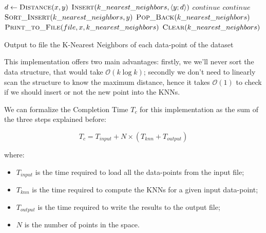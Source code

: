 \documentclass[12pt, letterpaper]{article}  %
\newcommand{\bigO}{\mathcal{O}}
\begin{document}
\begin{algorithm}
    \begin{algorithmic}
                    \State $d \gets \textsc{Distance}(x, y)$
                        \State $\textsc{Insert}(k\_nearest\_neighbors, \left < y ; d \right >)$
                        \State $continue$
                    \EndIf
                        \State $continue$ 
                    \EndIf
                    \State $\textsc{Sort\_Insert}(k\_nearest\_neighbors, y)$
                            \State $\textsc{Pop\_Back}(k\_nearest\_neighbors)$
                    \EndIf
                \EndFor
                \State $\textsc{Print\_to\_File}(file, x, k\_nearest\_neighbors)$
                \State $\textsc{Clear}(k\_nearest\_neighbors)$
            \EndFor
        \EndFunction
    \end{algorithmic}
    \caption{Output to file the K-Nearest Neighbors of each data-point of the dataset}
    \label{algo:efficient_knn}
\end{algorithm}

This implementation offers two main advantages: firstly, we we'll never sort the data structure, that would take $\bigO(k\log k)$; secondly we don't need to linearly scan the structure to know the maximum distance, hence it takes $\bigO(1)$ to check if we should insert or not the new point into the KNNs.

We can formalize the Completion Time \textit{$T_c$} for this implementation as the sum of the three steps explained before:

\begin{equation}
    \textit{$T_{c}$} = \textit{$T_{input}$} + \textit{$N$} \times (\textit{$T_{knn}$} + \textit{$T_{output}$})
    \label{eq:sequential_tc}
\end{equation}

where:
\begin{itemize}
    \item \textit{$T_{input}$} is the time required to load all the data-points from the input file;
    \item \textit{$T_{knn}$} is the time required to compute the KNNs for a given input data-point;
    \item \textit{$T_{output}$} is the time required to write the results to the output file;
    \item \textit{$N$} is the number of points in the space.
\end{itemize}
\newpage
\end{document}
